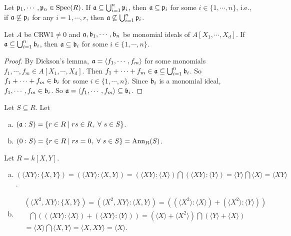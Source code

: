 \begin{theorem}
    Let $\mathfrak{p}_1,\cdots,\mathfrak{p}_n \in \operatorname{Spec}(R)$. If $\mathfrak{a} \subseteq \bigcup_{i=1}^n \mathfrak{p}_i$, then $\mathfrak{a} \subseteq \mathfrak{p}_i$ for some $i \in \{1,\cdots,n\}$, i.e., if $\mathfrak{a} \not \subseteq \mathfrak{p}_i$ for any $i = 1,\cdots,r$, then $\mathfrak{a} \not \subseteq \bigcup_{i=1}^n \mathfrak{p}_i$.
\end{theorem}

\begin{fact*} 
    Let $A$ be CRW1$\neq 0$ and $\mathfrak{a},\mathfrak{b}_1,\cdots,\mathfrak{b}_n$ be monomial ideals of $A[X_1,\cdots,X_d]$. If $\mathfrak{a} \subseteq \bigcup_{i=1}^n \mathfrak{b}_i$, then $\mathfrak{a} \subseteq \mathfrak{b}_i$ for some $i \in \{1,\cdots,n\}$.
\end{fact*}

\begin{proof}
     By Dickson's lemma, $\mathfrak{a} = \langle f_1,\cdots,f_m \rangle$ for some monomials $f_1,\cdots,f_m \in A[X_1,\cdots,X_d]$. Then $f_1 + \cdots + f_m \in \mathfrak{a} \subseteq \bigcup_{i=1}^n \mathfrak{b}_i$. So $f_1 + \cdots + f_m \in \mathfrak{b}_i$ for some $i \in \{1,\cdots,n\}$. Since $\mathfrak{b}_i$ is a monomial ideal, $f_1,\cdots,f_m \in \mathfrak{b}_i$. So $\mathfrak{a} = \langle f_1,\cdots,f_m \rangle \subseteq \mathfrak{b}_i$.
\end{proof}

\begin{definition}
    Let $S \subseteq R$. Let 
    \begin{enumerate}[(a)]
        \item 
            $(\mathfrak{a}:S) = \{r \in R \mid rs \in R,\ \forall \  s \in S\}$.
        \item
            $(0:S) = \{r \in R \mid rs = 0, \ \forall \  s \in S\} = \operatorname{Ann}_R(S)$.
    \end{enumerate}
\end{definition}

\begin{example}
    Let $R = k[X,Y]$. 
    \begin{enumerate}[(a)]
        \item $(\langle XY \rangle: \{X,Y\}) = (\langle XY \rangle: \langle X,Y \rangle) = (\langle XY \rangle: \langle X \rangle) \bigcap (\langle XY \rangle: \langle Y \rangle) = \langle Y \rangle \bigcap \langle X \rangle= \langle XY \rangle$.
        \item
            \begin{align*}
                & (\langle X^2,XY \rangle: \{X,Y\}) = (\langle X^2,XY \rangle: \langle X,Y \rangle) = \left((\langle X^2 \rangle: \langle X \rangle) + (\langle X^2 \rangle: \langle Y \rangle)\right) \\
                &\ \ \ \textstyle \bigcap\left((\langle XY \rangle: \langle X \rangle)+(\langle XY \rangle: \langle Y \rangle)\right) = (\langle X \rangle + \langle X^2 \rangle) \textstyle \bigcap (\langle Y \rangle + \langle X \rangle) \\
                &= \langle X \rangle \textstyle \bigcap \langle X,Y \rangle = \langle X,XY \rangle = \langle X \rangle.
            \end{align*}
    \end{enumerate}
\end{example}


